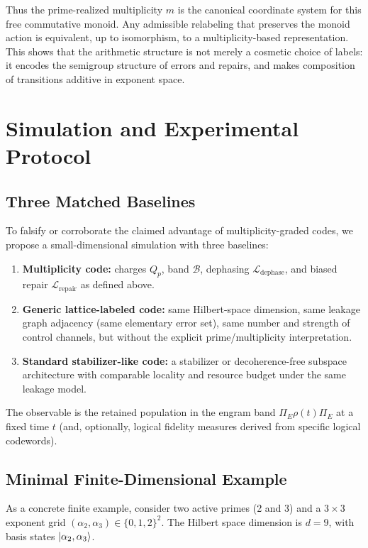 \documentclass[11pt]{article}
\begin{document}
Thus the prime-realized multiplicity $m$ is the canonical coordinate system
for this free commutative monoid. Any admissible relabeling that preserves
the monoid action is equivalent, up to isomorphism, to a multiplicity-based
representation. This shows that the arithmetic structure is not merely a
cosmetic choice of labels: it encodes the semigroup structure of errors and
repairs, and makes composition of transitions additive in exponent space.

\section{Simulation and Experimental Protocol}

\subsection{Three Matched Baselines}

To falsify or corroborate the claimed advantage of multiplicity-graded codes,
we propose a small-dimensional simulation with three baselines:

\begin{enumerate}[leftmargin=*]
  \item \textbf{Multiplicity code:} charges $Q_p$, band $\mathcal B$,
        dephasing $\mathcal L_{\text{dephase}}$, and biased repair
        $\mathcal L_{\text{repair}}$ as defined above.
  \item \textbf{Generic lattice-labeled code:} same Hilbert-space dimension,
        same leakage graph adjacency (same elementary error set), same
        number and strength of control channels, but without the explicit
        prime/multiplicity interpretation.
  \item \textbf{Standard stabilizer-like code:} a stabilizer or decoherence-free
        subspace architecture with comparable locality and resource budget
        under the same leakage model.
\end{enumerate}

The observable is the retained population in the engram band
$\Pi_E \rho(t) \Pi_E$ at a fixed time $t$ (and, optionally, logical fidelity
measures derived from specific logical codewords).

\subsection{Minimal Finite-Dimensional Example}

As a concrete finite example, consider two active primes (2 and 3) and a
$3\times 3$ exponent grid $(\alpha_2, \alpha_3) \in \{0,1,2\}^2$. The Hilbert
space dimension is $d = 9$, with basis states $\ket{\alpha_2,\alpha_3}$.
\end{document}
